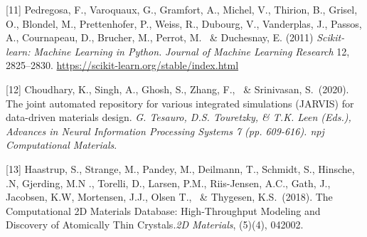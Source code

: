 \documentclass{article}
\begin{document}
{[11] Pedregosa, F., Varoquaux, G., Gramfort, A., Michel, V., Thirion, B., Grisel, O., Blondel, M., Prettenhofer, P., Weiss, R., Dubourg, V., Vanderplas, J., Passos, A., Cournapeau, D., Brucher, M., Perrot, M. \ \& Duchesnay, E. (2011) {\it Scikit-learn: Machine Learning in Python.} {\it Journal of Machine Learning Research} 12, 2825--2830. \url{https://scikit-learn.org/stable/index.html}

[12] Choudhary, K., Singh, A., Ghosh, S., Zhang, F., \ \& Srinivasan, S.\  (2020). The joint automated repository for various integrated simulations (JARVIS) for data-driven materials design. {\it G. Tesauro, D.S. Touretzky, \& T.K. Leen (Eds.), Advances in Neural Information Processing Systems 7 (pp. 609-616). npj Computational Materials}.

[13] Haastrup, S.,  Strange, M., Pandey, M., Deilmann, T., Schmidt, S., Hinsche, .N, Gjerding, M.N ., Torelli, D., Larsen, P.M., Riis-Jensen, A.C.,  Gath, J., Jacobsen, K.W, Mortensen, J.J., Olsen T., \  \& Thygesen, K.S.\  (2018). The Computational 2D Materials Database: High-Throughput Modeling and Discovery of Atomically Thin Crystals.{\it  2D Materials}, (5)(4), 042002.

}
\end{document}

